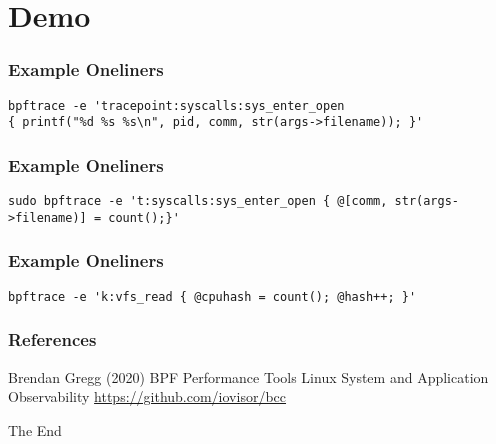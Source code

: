 \documentclass{beamer}
\begin{document}
\section{Demo}

\begin{frame}[fragile] %
\frametitle{Example Oneliners}
\begin{example}
\begin{verbatim}
bpftrace -e 'tracepoint:syscalls:sys_enter_open 
{ printf("%d %s %s\n", pid, comm, str(args->filename)); }'
\end{verbatim}
\end{example}
\end{frame}


\begin{frame}[fragile] %
\frametitle{Example Oneliners}
\begin{example}
\begin{verbatim}
sudo bpftrace -e 't:syscalls:sys_enter_open { @[comm, str(args->filename)] = count();}'
\end{verbatim}
\end{example}
\end{frame}


\begin{frame}[fragile] %
\frametitle{Example Oneliners}
\begin{example}[Concurrency]
\begin{verbatim}
bpftrace -e 'k:vfs_read { @cpuhash = count(); @hash++; }'
\end{verbatim}
\end{example}
\end{frame}


\begin{frame}
\frametitle{References}
\footnotesize{
\begin{thebibliography}{99} %
 Brendan Gregg (2020)
\newblock BPF Performance Tools
\newblock Linux System and Application Observability
 \url{https://github.com/iovisor/bcc}
\end{thebibliography}
}
\end{frame}


\begin{frame}
\Huge{\centerline{The End}}
\end{frame}

\end{document}
